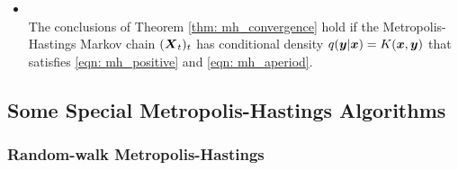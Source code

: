 \documentclass[11pt]{article}
\begin{document}
\begin{itemize}
\item \begin{corollary}\citep{robert1999monte}\\
The conclusions of Theorem \ref{thm: mh_convergence} hold if the Metropolis-Hastings Markov chain $(\boldsymbol{X}_t)_t$ has conditional density 
$q(\boldsymbol{y}|\boldsymbol{x}) = K(\boldsymbol{x}, \boldsymbol{y})$ that satisfies \eqref{eqn: mh_positive} and \eqref{eqn: mh_aperiod}. 
\end{corollary}
\end{itemize}

\subsection{Some Special Metropolis-Hastings Algorithms}
\subsubsection{Random-walk Metropolis-Hastings}
\end{document}
